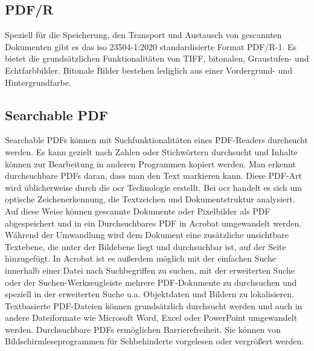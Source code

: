 \subsection{PDF/R}
Speziell für die Speicherung, den Transport und Austausch von gescannten Dokumenten gibt es das \gls{iso} 23504-1:2020 standardisierte Format PDF/R-1. Es bietet die grundsätzlichen Funktionalitäten von TIFF, bitonalen, Graustufen- und Echtfarbbilder. \cite{proj-consult} Bitonale Bilder bestehen lediglich aus einer Vordergrund- und Hintergrundfarbe. 


\subsection{Searchable PDF}
Searchable PDFs können mit Suchfunktionalitäten eines PDF-Readers durchsucht werden. Es kann gezielt nach Zahlen oder Stichwörtern durchsucht und Inhalte können zur Bearbeitung in anderen Programmen kopiert werden. Man erkennt durchsuchbare PDFs daran, dass man den Text markieren kann. Diese PDF-Art wird üblicherweise durch die \gls{ocr} Technologie erstellt. Bei \gls{ocr} handelt es sich um optische Zeichenerkennung, die Textzeichen und Dokumentstruktur analysiert. Auf diese Weise können gescannte Dokumente oder Pixelbilder als PDF abgespeichert und in ein Durchsuchbares PDF in Acrobat umgewandelt werden. Während der Umwandlung wird dem Dokument eine zusätzliche unsichtbare Textebene, die unter der Bildebene liegt und durchsuchbar ist, auf der Seite hinzugefügt. In Acrobat ist es außerdem möglich mit der einfachen Suche innerhalb einer Datei nach Suchbegriffen zu suchen, mit der erweiterten Suche oder der Suchen-Werkzeugleiste mehrere PDF-Dokumente zu durchsuchen und speziell in der erweiterten Suche u.a. Objektdaten und Bildern zu lokalisieren. Textbasierte PDF-Dateien können grundsätzlich durchsucht werden und auch in andere Dateiformate wie Microsoft Word, Excel oder PowerPoint umgewandelt werden. Durchsuchbare PDFs ermöglichen Barrierefreiheit. Sie können von Bildschirmleseprogrammen für Sehbehinderte vorgelesen oder vergrößert werden. 
\cite{adobe-search}